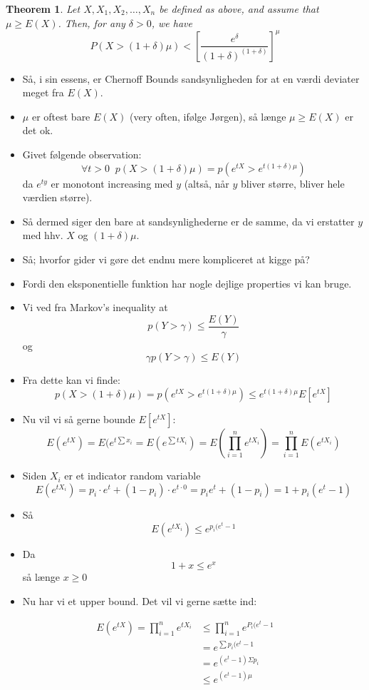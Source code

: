 \documentclass[11pt]{article}
\newtheorem{theorem}{Theorem}
\theoremstyle{definition}
\theoremstyle{remark}
\begin{document}
  \begin{theorem}
  Let $X, X_{1}, X_{2}, \ldots, X_{n}$ be defined as above, and assume that $\mu \geq E(X)$. Then, for any $\delta > 0$, we have
  \[P(X > (1+\delta)\mu) < \left[ \frac{e^{\delta}}{(1+\delta)^{(1+\delta)}} \right]^{\mu}\]
\end{theorem}
\begin{itemize}
\item Så, i sin essens, er Chernoff Bounds sandsynligheden for at en værdi deviater meget fra $E(X)$.
\item $\mu$ er oftest bare $E(X)$ (very often, ifølge Jørgen), så længe $\mu \geq E(X)$ er det ok.
\item Givet følgende observation: \[ \forall t > 0 \; \; p(X > (1 + \delta) \mu) = p(e^{tX} > e^{t(1+\delta)\mu}) \] da $e^{ty}$ er monotont increasing med $y$ (altså, når $y$ bliver større, bliver hele værdien større).
\item Så dermed siger den bare at sandsynlighederne er de samme, da vi erstatter $y$ med hhv. $X$ og $(1 + \delta) \mu$.
\item Så; hvorfor gider vi gøre det endnu mere kompliceret at kigge på? 
\item Fordi den eksponentielle funktion har nogle dejlige properties vi kan bruge.
\item Vi ved fra Markov's inequality at \[ p(Y > \gamma) \leq \frac{E(Y)}{\gamma} \] og \[ \gamma p(Y > \gamma) \leq E(Y) \]
\item Fra dette kan vi finde: \[ p(X > (1+ \delta) \mu) = p(e ^{tX} > e^{t(1+ \delta) \mu}) \leq e^{t(1+ \delta) \mu} E[e^{tX}] \]
\item Nu vil vi så gerne bounde $E[e^{tX}]$: \[ E(e^{tX}) = E(e^{t \sum x_{i}} = E(e^{\sum t X_{i}}) = E( \prod_{i=1}^{n}e^{tX_{i}}) = \prod_{i=1}^{n} E(e^{tX_{i}}) \]
\item Siden $X_{i}$ er et indicator random variable \[ E(e^{tX_{i}}) = p_{i} \cdot e^{t}+ (1-p_{i}) \cdot e^{t\cdot 0} = p_{i}e^{t} + (1-p_{i}) = 1 + p_{i}(e^{t}-1) \]
\item Så \[ E(e^{tX_{i}}) \leq e^{p_{i} (e^{t}-1} \]
\item Da \[ 1 + x \leq e^{x} \] så længe $x \geq 0$
\item Nu har vi et upper bound. Det vil vi gerne sætte ind:  
\end{itemize}

\begin{equation}
\begin{split}
  E(e^{tX}) = \prod_{i=1}^{n}e^{tX_{i}} &\leq \prod_{i=1}^{n} e^{P_{i}(e^{t}-1} \\
                                    &= e^{\sum p_{i} (e^{t}-1}\\
                                    &= e^{(e^{t}-1) \Sigma p_{i}}\\
  &\leq e^{(e^{t}-1)\mu}
\end{split}
\end{equation}
\end{document}
